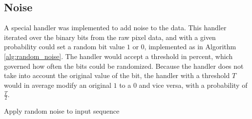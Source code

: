 \subsection{Noise}
A special handler was implemented to add noise to the data. This handler iterated over the binary bits from the raw pixel data, and with a given probability could set a random bit value \(1\) or \(0\), implemented as in Algorithm \ref{alg:random_noise}. The handler would accept a threshold in percent, which governed how often the bits could be randomized. Because the handler does not take into account the original value of the bit, the handler with a threshold \(T\) would in average modify an original \(1\) to a \(0\) and vice versa, with a probability of \(\frac{T}{2}\).

\begin{algorithm}
    \caption{Apply random noise to input sequence
        \label{alg:random_noise}}
    \begin{algorithmic}[1]
        \Statex
                \EndIf
            \EndFor
        \State {}
        \EndFunction
    \end{algorithmic}
\end{algorithm}